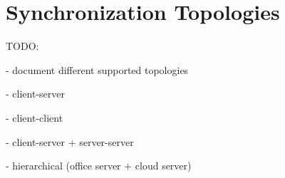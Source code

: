 
\section{Synchronization Topologies}

TODO:

- document different supported topologies

- client-server

- client-client

- client-server + server-server

- hierarchical (office server + cloud server)

